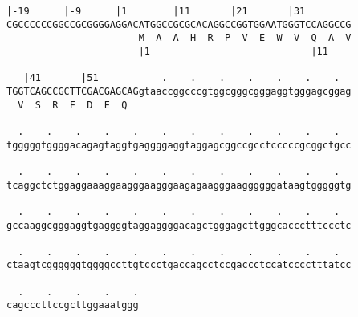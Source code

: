 \documentclass{article}
\begin{document}
\newpage
\begin{Verbatim}[fontfamily=courier]
    |-19      |-9      |1        |11       |21       |31    
CGCCCCCCGGCCGCGGGGAGGACATGGCCGCGCACAGGCCGGTGGAATGGGTCCAGGCCG
                       M  A  A  H  R  P  V  E  W  V  Q  A  V
                       |1                            |11    

   |41       |51           .    .    .    .    .    .    .  
TGGTCAGCCGCTTCGACGAGCAGgtaaccggcccgtggcgggcgggaggtgggagcggag
  V  S  R  F  D  E  Q                                       

  .    .    .    .    .    .    .    .    .    .    .    .  
tgggggtggggacagagtaggtgaggggaggtaggagcggccgcctcccccgcggctgcc

  .    .    .    .    .    .    .    .    .    .    .    .  
tcaggctctggaggaaaggaagggaagggaagagaagggaaggggggataagtgggggtg

  .    .    .    .    .    .    .    .    .    .    .    .  
gccaaggcgggaggtgaggggtaggaggggacagctgggagcttgggcaccctttccctc

  .    .    .    .    .    .    .    .    .    .    .    .  
ctaagtcggggggtggggccttgtccctgaccagcctccgaccctccatcccctttatcc

  .    .    .    .    .
cagcccttccgcttggaaatggg
\end{Verbatim}
\newpage
\end{document}
